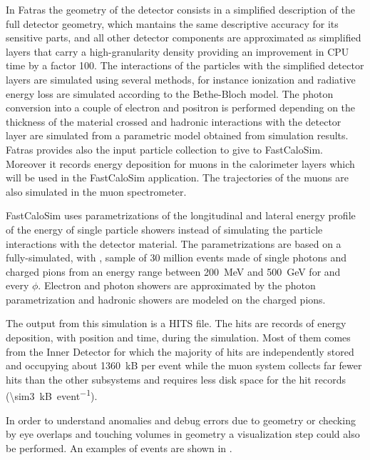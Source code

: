 In Fatras the geometry of the detector consists in a simplified description of the full detector geometry, which mantains the same descriptive accuracy for its sensitive parts, and all other detector components are approximated as simplified layers that carry a high-granularity density providing an improvement in CPU time by a factor \num{100}. The interactions of the particles with the simplified detector layers are simulated using several methods, for instance ionization and radiative energy loss are simulated according to the Bethe-Bloch model. The photon conversion into a couple of electron and positron is performed depending on the thickness of the material crossed and hadronic interactions with the detector layer are simulated from a parametric model obtained from \geant simulation results. Fatras provides also the input particle collection to give to FastCaloSim. Moreover it records energy deposition for muons in the calorimeter layers which will be used in the FastCaloSim application. The trajectories of the muons are also simulated in the muon spectrometer.

FastCaloSim uses parametrizations of the longitudinal and lateral energy profile of the energy of single particle showers instead of simulating the particle interactions with the detector material. The parametrizations are based on a fully-simulated, with \geant, sample of 30 million events made of single photons and charged pions from an energy range between \SI{200}{\MeV} and \SI{500}{\GeV} for  and every $\phi$. Electron and photon showers are approximated by the photon parametrization and hadronic showers are modeled on the charged pions.

The output from this simulation is a HITS file. The hits are records of energy deposition, with position and time, during the simulation. Most of them comes from the Inner Detector for which the majority of hits are independently stored and occupying about \SI{1360}{kB} per event while the muon system collects far fewer hits than the other subsystems and requires less disk space for the hit records (\SI{\sim3}{kB\per event}).

In order to understand anomalies and debug errors due to geometry or checking by eye overlaps and touching volumes in geometry a visualization step could also be performed. An examples of events are shown in \Fig{\ref{fig:simulation}}.

